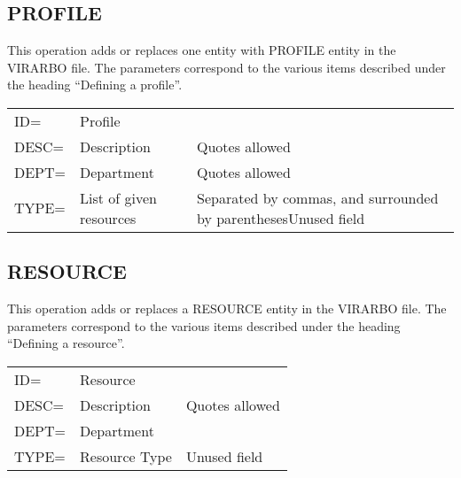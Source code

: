 \documentclass[letterpaper,10pt,english]{sphinxmanual}
\begin{document}

\subsection{PROFILE}
\label{\detokenize{Installation_Guide:profile}}\label{\detokenize{Installation_Guide:index-167}}
This operation adds or replaces one entity with PROFILE entity in the VIRARBO file. The parameters correspond to the various items described under the heading “Defining a profile”.


\begin{savenotes}\sphinxattablestart
\centering
\begin{tabulary}{\linewidth}[t]{|T|T|T|}
\hline
{}\relax &\relax &\relax \\
\hline
ID=
&
Profile
&\\
\hline
DESC=
&
Description
&
Quotes allowed
\\
\hline
DEPT=
&
Department
&
Quotes allowed
\\
\hline
TYPE=
&
List of given resources
&
Separated by commas, and surrounded by parenthesesUnused field
\\
\hline
\end{tabulary}
\par
\sphinxattableend\end{savenotes}


\subsection{RESOURCE}
\label{\detokenize{Installation_Guide:index-168}}\label{\detokenize{Installation_Guide:resource}}
This operation adds or replaces a RESOURCE entity in the VIRARBO file. The parameters correspond to the various items described under the heading “Defining a resource”.


\begin{savenotes}\sphinxattablestart
\centering
\begin{tabulary}{\linewidth}[t]{|T|T|T|}
\hline
{}\relax &\relax &\relax \\
\hline
ID=
&
Resource
&\\
\hline
DESC=
&
Description
&
Quotes allowed
\\
\hline
DEPT=
&
Department
&\\
\hline
TYPE=
&
Resource Type
&
Unused field
\\
\hline
\end{tabulary}
\par
\sphinxattableend\end{savenotes}
\end{document}
